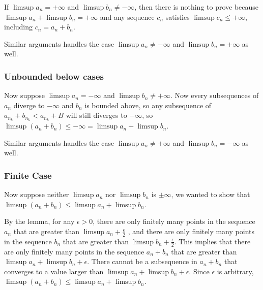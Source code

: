 If $ \limsup a_n = +\infty $ and $ \limsup b_n \ne -\infty $, then there is nothing to prove because $ \limsup a_n + \limsup b_n = +\infty $ and any sequence $ c_n $ satisfies $ \limsup c_n \le +\infty $, including $ c_n = a_n + b_n $.

Similar arguments handles the case $ \limsup a_n \ne -\infty $ and $ \limsup b_n = +\infty $ as well.

\subsubsection*{Unbounded below cases}
Now suppose $ \limsup a_n = -\infty $ and $ \limsup b_n \ne +\infty $. Now every subsequences of $ a_n $ diverge to $ -\infty $ and $ b_n $ is bounded above, so any subsequence of $ a_{n_k} + b_{n_k} < a_{n_k} + B $ will still diverges to $ -\infty $, so
$  \limsup (a_n + b_n) \leq -\infty = \limsup a_n + \limsup b_n $.

Similar arguments handles the case $ \limsup a_n \ne +\infty $ and $ \limsup b_n = -\infty $ as well.

\subsubsection*{Finite Case}
Now suppose neither $ \limsup a_n $ nor $ \limsup b_n $ is $ \pm\infty $, we wanted to show that $ \limsup (a_n + b_n) \leq \limsup a_n + \limsup b_n $.

By the lemma, for any $ \epsilon > 0 $, there are only finitely many points in the sequence $ a_n $ that are greater than $ \limsup a_n + \frac{\epsilon}{2} $ , and there are only finitely many points in the sequence $ b_n $ that are greater than $ \limsup b_n + \frac{\epsilon}{2} $. This implies that there are only finitely many points in the sequence $ a_n + b_n $ that are greater than $ \limsup a_n + \limsup b_n + \epsilon $. There cannot be a subsequence in $ a_n + b_n $ that converges to a value larger than $ \limsup a_n + \limsup b_n + \epsilon $. Since $ \epsilon $ is arbitrary, $ \limsup (a_n + b_n) \leq \limsup a_n + \limsup b_n $.